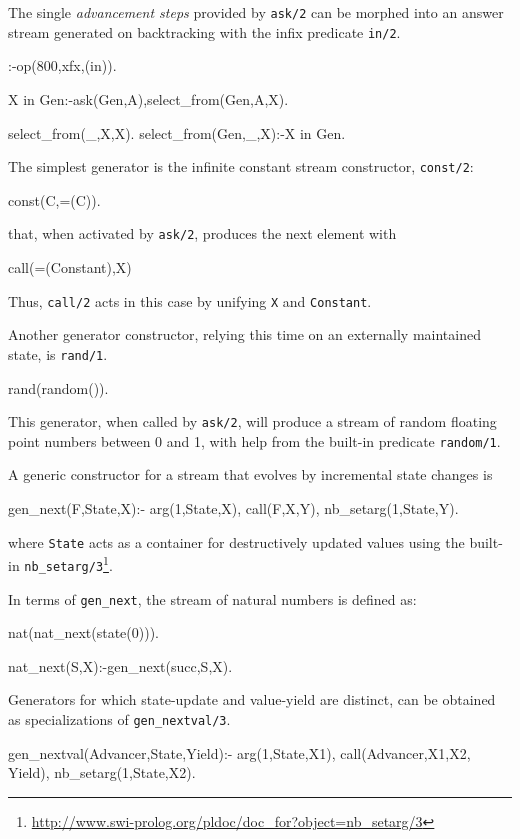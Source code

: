 \documentclass{new_tlp}
\begin{document}
The single {\em advancement steps} provided by {\tt ask/2} can be morphed into an answer stream generated on backtracking with the infix predicate {\tt in/2}.
\begin{code}
:-op(800,xfx,(in)).

X in Gen:-ask(Gen,A),select_from(Gen,A,X).

select_from(_,X,X).
select_from(Gen,_,X):-X in Gen.
\end{code}

The simplest generator is the infinite constant stream constructor, {\tt const/2}:
\begin{codex}
const(C,=(C)).
\end{codex}
that, when activated by {\tt ask/2}, produces the next element with
\begin{codex}
call(=(Constant),X)
\end{codex}
Thus, {\tt call/2} acts in this case by unifying {\tt X} and {\tt Constant}.

Another generator constructor, relying this time on an externally maintained state, is {\tt rand/1}.
\begin{code}
rand(random()).
\end{code}
This generator, when called by {\tt ask/2}, will produce a stream of random floating point numbers between 0 and 1, with help from the built-in predicate {\tt random/1}.

A generic constructor for a stream that evolves by incremental state changes is
\begin{code}
gen_next(F,State,X):-
  arg(1,State,X),
  call(F,X,Y),
  nb_setarg(1,State,Y).
\end{code}
where {\tt State} acts as a container for destructively updated values using the built-in
{\tt nb\_setarg/3}\footnote{\url{http://www.swi-prolog.org/pldoc/doc_for?object=nb_setarg/3}}.


In terms of {\tt gen\_next}, the stream of natural numbers is defined as:
\begin{code}
nat(nat_next(state(0))).

nat_next(S,X):-gen_next(succ,S,X).
\end{code}

Generators for which state-update and value-yield are distinct,
can be obtained as specializations of {\tt gen\_nextval/3}.
\begin{code}
gen_nextval(Advancer,State,Yield):-
  arg(1,State,X1),
  call(Advancer,X1,X2, Yield),
  nb_setarg(1,State,X2).
\end{code}
\end{document}
